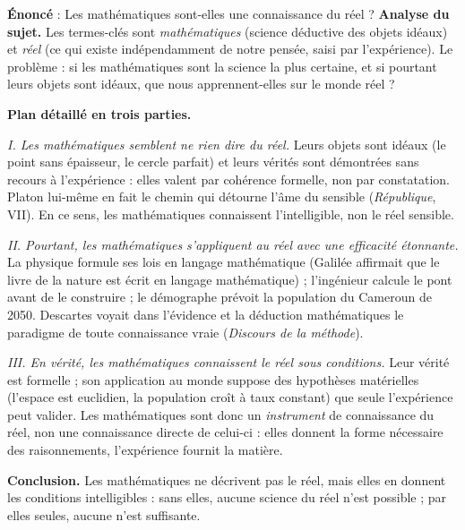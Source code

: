 \documentclass[11pt]{article}
\begin{document}
\begin{exoresolu}
\textbf{Énoncé} : Les mathématiques sont-elles une connaissance du réel ?
\tcblower
\textbf{Analyse du sujet.} Les termes-clés sont \emph{mathématiques} (science déductive des objets idéaux) et \emph{réel} (ce qui existe indépendamment de notre pensée, saisi par l'expérience). Le problème : si les mathématiques sont la science la plus certaine, et si pourtant leurs objets sont idéaux, que nous apprennent-elles sur le monde réel ?

\textbf{Plan détaillé en trois parties.}

\emph{I. Les mathématiques semblent ne rien dire du réel.} Leurs objets sont idéaux (le point sans épaisseur, le cercle parfait) et leurs vérités sont démontrées sans recours à l'expérience : elles valent par cohérence formelle, non par constatation. Platon lui-même en fait le chemin qui détourne l'âme du sensible (\emph{République}, VII). En ce sens, les mathématiques connaissent l'intelligible, non le réel sensible.

\emph{II. Pourtant, les mathématiques s'appliquent au réel avec une efficacité étonnante.} La physique formule ses lois en langage mathématique (Galilée affirmait que le livre de la nature est écrit en langage mathématique) ; l'ingénieur calcule le pont avant de le construire ; le démographe prévoit la population du Cameroun de 2050. Descartes voyait dans l'évidence et la déduction mathématiques le paradigme de toute connaissance vraie (\emph{Discours de la méthode}).

\emph{III. En vérité, les mathématiques connaissent le réel \emph{sous conditions}.} Leur vérité est formelle ; son application au monde suppose des hypothèses matérielles (l'espace est euclidien, la population croît à taux constant) que seule l'expérience peut valider. Les mathématiques sont donc un \emph{instrument} de connaissance du réel, non une connaissance directe de celui-ci : elles donnent la forme nécessaire des raisonnements, l'expérience fournit la matière.

\textbf{Conclusion.} Les mathématiques ne décrivent pas le réel, mais elles en donnent les conditions intelligibles : sans elles, aucune science du réel n'est possible ; par elles seules, aucune n'est suffisante.
\end{exoresolu}
\end{document}
